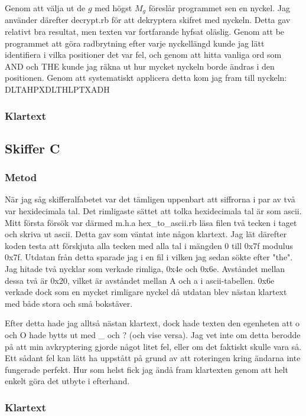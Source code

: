 \documentclass[a4paper,11pt]{article}
\begin{document}
			Genom att välja ut de $g$ med högst $M_g$ föreslår programmet sen en nyckel. Jag använder därefter decrypt.rb för att dekryptera skifret med nyckeln. Detta gav relativt bra resultat, men texten var fortfarande hyfsat oläslig. Genom att be programmet att göra radbrytning efter varje nyckellängd kunde jag lätt identifiera i vilka positioner det var fel, och genom att hitta vanliga ord som AND och THE kunde jag räkna ut hur mycket nyckeln borde ändras i den positionen. Genom att systematiskt applicera detta kom jag fram till nyckeln: \\
DLTAHPXDLTHLPTXADH
	
			\subsubsection{Klartext}
				
		
		\subsection{Skiffer C}
			\subsubsection{Metod}
			När jag såg skifferalfabetet var det tämligen uppenbart att siffrorna i par av två var hexidecimala tal. Det rimligaste sättet att tolka hexidecimala tal är som ascii.
			Mitt första försök var därmed m.h.a hex\_to\_ascii.rb läsa filen två tecken i taget och skriva ut ascii. Detta gav som väntat inte någon klartext. Jag lät därefter koden testa att förskjuta alla tecken med alla tal i mängden 0 till 0x7f modulus 0x7f. Utdatan från detta sparade jag i en fil i vilken jag sedan sökte efter "the". Jag hitade två nycklar som verkade rimliga, 0x4e och 0x6e. Avståndet mellan dessa två är 0x20, vilket är avståndet mellan A och a i ascii-tabellen. 0x6e verkade dock som en mycket rimligare nyckel då utdatan blev nästan klartext med både stora och små bokstäver.

			Efter detta hade jag alltså nästan klartext, dock hade texten den egenheten att o och O hade bytts ut med \_ och ? (och vise versa). Jag vet inte om detta berodde på att min avkryptering gjorde något litet fel, eller om det faktiskt skulle vara så. Ett sådant fel kan lätt ha uppstått på grund av att roteringen kring ändarna inte fungerade perfekt. Hur som helst fick jag ändå fram klartexten genom att helt enkelt göra det utbyte i efterhand.

			\subsubsection{Klartext}
				
\end{document}
